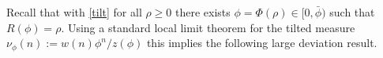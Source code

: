 \documentclass[pdflatex,sn-mathphys-num]{sn-jnl}%
\theoremstyle{thmstyleone}%
\theoremstyle{thmstyletwo}%
\theoremstyle{thmstylethree}%
\begin{document}
    


Recall that with \eqref{tilt} for all $\rho\geq 0$ there exists $\phi =\Phi (\rho )\in [0,\bar\phi )$ such that $R(\phi )=\rho$. Using a standard local limit theorem \cite{bib_DM95, borovkov2020} for the tilted measure $\nu_\phi (n):=w(n)\phi^n /z(\phi )$ this implies the following large deviation result.
\end{document}
